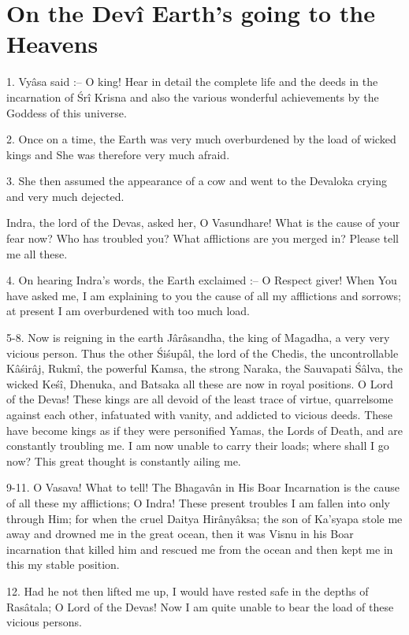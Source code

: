 ﻿\chapter{On the Dev\^i Earth's going to the Heavens}

1. Vy\^asa said :-- O king! Hear in detail the complete life and the deeds in the incarnation of \'Sr\^i Krisna and also the various wonderful achievements by the Goddess of this universe.

2. Once on a time, the Earth was very much overburdened by the load of wicked kings and She was therefore very much afraid.

3. She then assumed the appearance of a cow and went to the Devaloka crying and very much dejected.

Indra, the lord of the Devas, asked her, O Vasundhare! What is the cause of your fear now? Who has troubled you? What afflictions are you merged in? Please tell me all these.

4. On hearing Indra's words, the Earth exclaimed :-- O Respect giver! When You have asked me, I am explaining to you the cause of all my afflictions and sorrows; at present I am overburdened with too much load.

5-8. Now is reigning in the earth J\^ar\^asandha, the king of Magadha, a very very vicious person. Thus the other \'Si\'sup\^al, the lord of the Chedis, the uncontrollable K\^a\'sir\^aj, Rukm\^i, the powerful Kamsa, the strong Naraka, the Sauvapati \'S\^alva, the wicked Ke\'s\^i, Dhenuka, and Batsaka all these are now in royal positions. O Lord of the Devas! These kings are all devoid of the least trace of virtue, quarrelsome against each other, infatuated with vanity, and addicted to vicious deeds. These have become kings as if they were personified Yamas, the Lords of Death, and are constantly troubling me. I am now unable to carry their loads; where shall I go now? This great thought is constantly ailing me.

9-11. O Vasava! What to tell! The Bhagav\^an in His Boar Incarnation is the cause of all these my afflictions; O Indra! These present troubles I am fallen into only through Him; for when the cruel Daitya Hir\^any\^aksa; the son of Ka'syapa stole me away and drowned me in the great ocean, then it was Visnu in his Boar incarnation that killed him and rescued me from the ocean and then kept me in this my stable position.

12. Had he not then lifted me up, I would have rested safe in the depths of Ras\^atala; O Lord of the Devas! Now I am quite unable to bear the load of these vicious persons.


